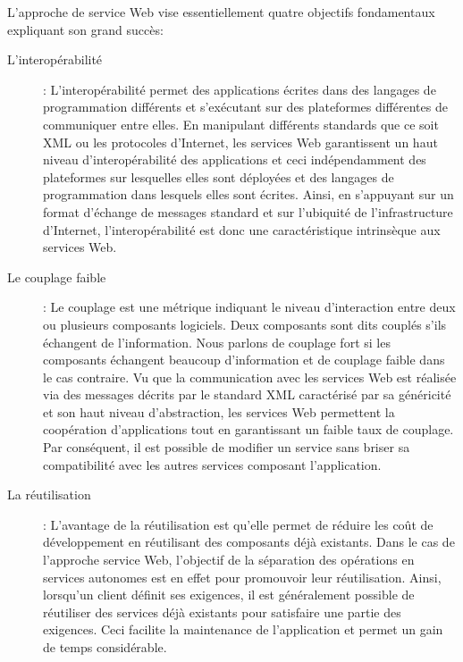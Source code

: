 	L'approche de service Web vise essentiellement quatre objectifs fondamentaux expliquant son grand succès:\\
	\begin{description} %
	    \item[L'interopérabilité] : L'interopérabilité permet des applications écrites dans des langages 
		de programmation différents et s’exécutant sur des plateformes différentes de communiquer entre elles. 
		En manipulant différents standards que ce soit XML ou les protocoles d’Internet, les services Web garantissent
		un haut niveau d’interopérabilité des applications et ceci indépendamment des plateformes sur lesquelles 
		elles sont déployées et des langages de programmation dans lesquels elles sont écrites. Ainsi,
		en s’appuyant sur un format d’échange de messages standard et sur l'ubiquité de l'infrastructure d’Internet,
		l'interopérabilité est donc une caractéristique intrinsèque aux services Web.

	    \item[Le couplage faible] : Le couplage est une métrique indiquant le niveau d’interaction entre deux ou plusieurs
		composants logiciels. Deux composants sont dits couplés s’ils échangent de l'information. Nous parlons 
		de couplage fort si les composants échangent beaucoup d’information et de couplage faible dans le cas contraire. 
		Vu que la communication avec les services Web est réalisée via des messages décrits par le standard XML 
		caractérisé par sa généricité et son haut niveau d’abstraction, les services Web permettent la coopération 
		d’applications tout en garantissant un faible taux de couplage.  Par conséquent, il est possible de modifier
		un service sans briser sa compatibilité avec les autres services composant l'application.

	    \item[La réutilisation] : L'avantage de la réutilisation est qu'elle permet de réduire les coût de 
		développement en réutilisant des composants déjà existants. Dans le cas de l'approche service Web, 
		l'objectif de la séparation des opérations en services autonomes est en effet pour promouvoir leur 
		réutilisation. Ainsi, lorsqu'un client définit ses exigences, il est généralement possible de réutiliser
		des services déjà existants pour satisfaire une partie des exigences. Ceci facilite la maintenance de
		l'application et permet un gain de temps considérable.


\end{description}
